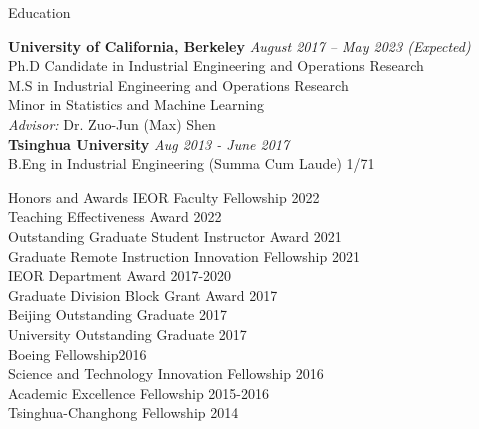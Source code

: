 \documentclass{resume} %
\begin{document}

\begin{rSection}{Education}

{\bf University of California, Berkeley} \hfill {\em August 2017 -- May 2023 (Expected)} 
\\ Ph.D Candidate in Industrial Engineering and Operations Research \hfill 
\\ M.S in Industrial Engineering and Operations Research
\\ Minor in Statistics and Machine Learning
\\ {\textit{Advisor:} Dr. Zuo-Jun (Max) Shen} 
\\{\bf Tsinghua University} \hfill {\em Aug 2013 - June 2017} 
\\ B.Eng in Industrial Engineering (Summa Cum Laude) \hfill { 1/71 }
\end{rSection}

\begin{rSection}{Honors and Awards}
IEOR Faculty Fellowship \hfill {2022}\\
Teaching Effectiveness Award \hfill {2022}\\
Outstanding Graduate Student Instructor Award \hfill {2021}\\
Graduate Remote Instruction Innovation Fellowship \hfill {2021}\\
IEOR Department Award \hfill {2017-2020}\\
Graduate Division Block Grant Award \hfill {2017}\\
Beijing Outstanding Graduate \hfill {2017}\\
University Outstanding Graduate \hfill {2017}\\
Boeing Fellowship\hfill {2016}\\
Science and Technology Innovation Fellowship \hfill {2016}\\
Academic Excellence Fellowship \hfill {2015-2016}\\
Tsinghua-Changhong Fellowship \hfill{2014}
\end{rSection}
\end{document}
